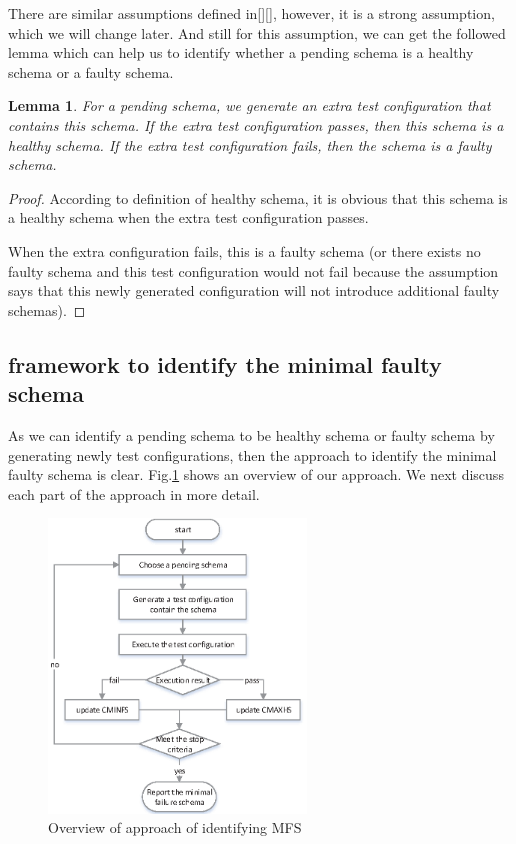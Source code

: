 \documentclass[10pt,journal,cspaper,compsoc]{IEEEtran}
\begin{document}
There are similar assumptions defined in[][], however, it is a strong assumption, which we will change later. And still for this assumption, we can get the followed lemma which can help us to identify whether a pending schema is a healthy schema or a faulty schema.
\newtheorem{lemma}{Lemma}
\begin{lemma}
For a pending schema, we generate an extra test configuration that contains this schema. If the extra test configuration passes, then this schema is a healthy schema. If the extra test configuration fails, then the schema is a faulty schema.
\end{lemma}
\begin{proof}
According to definition of healthy schema, it is obvious that this schema is a healthy schema when the extra test configuration passes.

When the extra configuration fails, this is a faulty schema (or there exists no faulty schema and this test configuration would not fail because the assumption says that this newly generated configuration will not introduce additional faulty schemas).
\end{proof}

\subsection{framework to identify the minimal faulty schema}
As we can identify a pending schema to be healthy schema or faulty schema by generating newly test configurations, then the approach to identify the minimal faulty schema is clear. Fig.\ref{fig_overview} shows an overview of our approach. We next discuss each part of the approach in more detail.
\begin{figure}
 \centering
 \includegraphics[width=2.7in]{gp.eps}
 \caption{Overview of approach of identifying MFS}
 \label{fig_overview}
\end{figure}
\end{document}
